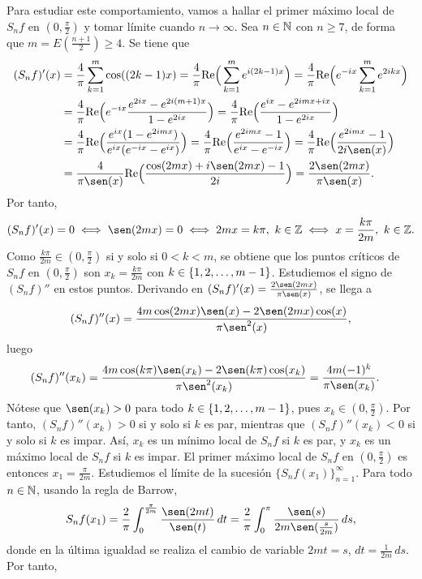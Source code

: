 \documentclass[a4paper, 12pt]{book}
\begin{document}
Para estudiar este comportamiento, vamos a hallar el primer máximo local de $S_nf$ en $(0,\frac{\pi}{2})$ y tomar límite cuando $n \to \infty$. Sea $n \in \mathbb N$ con $n \geq 7$, de forma que $m = E(\frac{n+1}{2}) \geq 4$. Se tiene que
\begin{align*}
    (S_nf)'(x) &= \frac{4}{\pi}\sum_{k=1}^m \cos((2k-1)x) = \frac{4}{\pi}\real\Bigl(\,\sum_{k=1}^m e^{i(2k-1)x}\Bigr) = \frac{4}{\pi}\real\Bigl(e^{-ix}\sum_{k=1}^m e^{2ikx}\Bigr) \\
    &= \frac{4}{\pi}\real\Bigl(e^{-ix}\frac{e^{2ix}-e^{2i(m+1)x}}{1-e^{2ix}}\Bigr) = \frac{4}{\pi}\real\Bigl(\frac{e^{ix}-e^{2imx+ix}}{1-e^{2ix}}\Bigr) \\ 
    &= \frac{4}{\pi}\real\Bigl(\frac{e^{ix}(1-e^{2imx})}{e^{ix}(e^{-ix}-e^{ix})}\Bigr) = \frac{4}{\pi}\real\Bigl(\frac{e^{2imx}-1}{e^{ix}-e^{-ix}}\Bigr) = \frac{4}{\pi}\real\Bigl(\frac{e^{2imx}-1}{2i\sen(x)}\Bigr) \\
    &= \frac{4}{\pi\sen(x)}\real\Bigl(\frac{\cos(2mx)+i\sen(2mx)-1}{2i}\Bigr) =  \frac{2\sen(2mx)}{\pi\sen(x)}.
\end{align*}
Por tanto,
\[(S_nf)'(x) = 0 \iff \sen(2mx) = 0 \iff 2mx = k\pi, \ k \in \Z \iff x = \frac{k\pi}{2m}, \ k \in \Z.\]
Como $\frac{k\pi}{2m}\in (0,\frac{\pi}{2})$ si y solo si $0 < k < m$, se obtiene que los puntos críticos de $S_nf$ en $(0,\frac{\pi}{2})$ son $x_k = \frac{k\pi}{2m}$ con $k \in \{1,2,\mathellipsis,m-1\}$. Estudiemos el signo de $(S_nf)''$ en estos puntos. Derivando en $(S_nf)'(x) = \frac{2\sen(2mx)}{\pi\sen(x)}$, se llega a
\[(S_nf)''(x) = \frac{4m\cos(2mx)\sen(x)-2\sen(2mx)\cos(x)}{\pi\sen^2(x)},\]
luego
\begin{align*}
    (S_nf)''(x_k) &= \frac{4m\cos(k\pi)\sen(x_k)-2\sen(k\pi)\cos(x_k)}{\pi\sen^2(x_k)} = \frac{4m(-1)^k}{\pi\sen(x_k)}.
\end{align*}
Nótese que $\sen(x_k) > 0$ para todo $k \in \{1,2,\mathellipsis,m-1\}$, pues $x_k \in (0,\frac{\pi}{2})$. Por tanto, $(S_nf)''(x_k) > 0$ si y solo si $k$ es par, mientras que $(S_nf)''(x_k) < 0$ si y solo si $k$ es impar. Así, $x_k$ es un mínimo local de $S_nf$ si $k$ es par, y $x_k$ es un máximo local de $S_nf$ si $k$ es impar. El primer máximo local de $S_nf$ en $(0,\frac{\pi}{2})$ es entonces $x_1 = \frac{\pi}{2m}$. Estudiemos el límite de la sucesión $\{S_nf(x_1)\}_{n=1}^\infty$. Para todo $n \in \mathbb N$, usando la regla de Barrow,
\[S_nf(x_1) = \frac{2}{\pi}\integral{0}{\frac{\pi}{2m}}{\frac{\sen(2mt)}{\sen(t)}} = \frac{2}{\pi}\integral[s]{0}{\pi}{\frac{\sen(s)}{2m\sen(\frac{s}{2m})}},\]
donde en la última igualdad se realiza el cambio de variable $2mt = s$, $dt = \frac{1}{2m}\, ds$. Por tanto,
\end{document}
